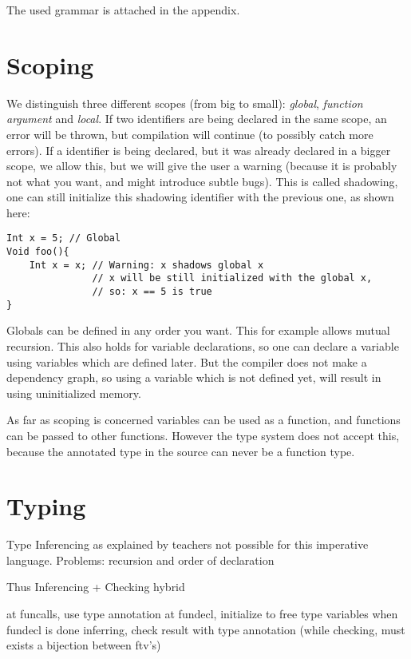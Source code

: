 \documentclass[14pt]{amsart}
\begin{document}
The used grammar is attached in the appendix.

\section{Scoping}
We distinguish three different scopes (from big to small): \emph{global}, \emph{function argument} and \emph{local}. If two identifiers are being declared in the same scope, an error will be thrown, but compilation will continue (to possibly catch more errors). If a identifier is being declared, but it was already declared in a bigger scope, we allow this, but we will give the user a warning (because it is probably not what you want, and might introduce subtle bugs). This is called shadowing, one can still initialize this shadowing identifier with the previous one, as shown here:

\begin{lstlisting}
Int x = 5; // Global
Void foo(){
    Int x = x; // Warning: x shadows global x
               // x will be still initialized with the global x,
               // so: x == 5 is true
}
\end{lstlisting}

Globals can be defined in any order you want. This for example allows mutual recursion. This also holds for variable declarations, so one can declare a variable using variables which are defined later. But the compiler does not make a dependency graph, so using a variable which is not defined yet, will result in using uninitialized memory.

As far as scoping is concerned variables can be used as a function, and functions can be passed to other functions. However the type system does not accept this, because the annotated type in the source can never be a function type.

\section{Typing}

Type Inferencing as explained by teachers not possible for this imperative language.
Problems: recursion and order of declaration

Thus Inferencing + Checking hybrid

at funcalls, use type annotation
at fundecl, initialize to free type variables
when fundecl is done inferring, check result with type annotation (while checking, must exists a bijection between ftv's)

\newcommand{\T}{\mathcal{T}}
\newcommand{\U}{\mathcal{U}}
\newcommand{\s}{\ast}
\newcommand{\sn}[1]{{\s_{#1}}}
\end{document}
